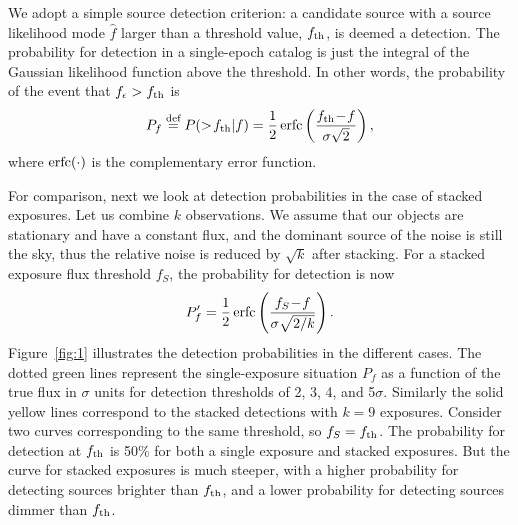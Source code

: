 \documentclass[twocolumn]{emulateapj}
\newcommand{\erfc}{{\rm{}erfc}}
\newcommand*{\defeq}{\stackrel{\text{def}}{=}}
\newcommand{\eind}{\epsilon}  %
\newcommand{\edata}{D_\eind}  %
\newcommand{\flux}{f}
\newcommand{\fest}{\hat{\flux}}  %
\newcommand{\dtxn}{\mathcal{D}}  %
\newcommand{\ndtxn}{\mathcal{N}}  %
\newcommand{\accept}{\mathcal{A}}  %
\newcommand{\fth}{\flux_{\rm th}}
\begin{document}



We adopt a simple source detection criterion: a candidate source with a source likelihood mode $\fest$ larger than a threshold value, $\fth$, is deemed a detection.
The probability for detection in a single-epoch catalog is just the integral of the Gaussian likelihood function above the threshold. 
In other words, the probability of the event that \mbox{$\flux_\eind>\fth$} is
%
\begin{equation}\label{eq:pf}
P_f \defeq P(>\!\fth|f) = \frac{1}{2}\,\erfc\left(\frac{\fth\!-\!f}{\sigma\sqrt{2}}\right),
\end{equation}
%
where $\erfc(\cdot)$ is the complementary error function.
 
For comparison, next we look at detection probabilities in the case of stacked exposures.
Let us combine $k$ observations.
We assume that our objects are stationary and have a constant flux, and the dominant source of the noise is still the sky, thus the relative noise is reduced by $\sqrt{k}$ after stacking.
For a stacked exposure flux threshold $f_S$, the probability for detection is now
%
\begin{equation}
P'_f = \frac{1}{2}\,\erfc\left(\frac{f_S\!-\!f}{\sigma\sqrt{2/k}}\right).
\end{equation}
%
Figure~\ref{fig:1} illustrates the detection probabilities in the different cases.
The dotted green lines represent the single-exposure situation $P_f$ as a function of the true flux in $\sigma$ units for detection thresholds of 2, 3, 4, and 5$\sigma$.
Similarly the solid yellow lines correspond to the stacked detections with \mbox{$k\!=\!9$} exposures.
Consider two curves corresponding to the same threshold, so $f_S = \fth$.
The probability for detection at $\fth$ is 50\% for both a single exposure and stacked exposures.
But the curve for stacked exposures is much steeper, with a higher probability for detecting sources brighter than $\fth$, and a lower probability for detecting sources dimmer than $\fth$.
\end{document}
